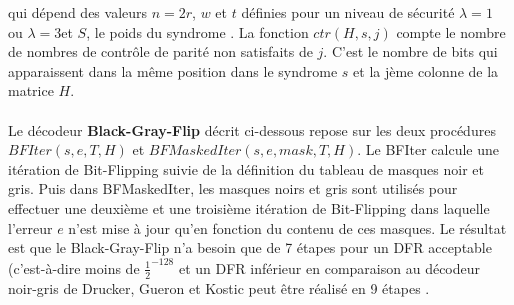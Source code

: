 \documentclass[12pt,openany]{report}
\begin{document}
qui dépend des valeurs $n = 2r$, $w$ et $t$ définies pour un niveau de sécurité $\lambda = 1$ ou
$\lambda = 3$et $S$, le poids du syndrome \cite{aragon2020}. La fonction $ctr(H, s, j)$ compte le nombre de nombres de contrôle de parité non satisfaits de $j$. C'est le nombre de bits qui apparaissent dans la même position dans le syndrome $s$ et la jème colonne de la matrice $\mathit{H}$.\\
\paragraph{}
Le décodeur \textbf{Black-Gray-Flip} décrit ci-dessous repose sur les deux procédures
$BFIter(s, e, T, H)$ et $BFMaskedIter(s, e, mask, T, H)$. Le BFIter calcule une
itération de Bit-Flipping suivie de la définition du tableau de masques noir et gris. Puis dans
BFMaskedIter, les masques noirs et gris sont utilisés pour effectuer une deuxième et une troisième
itération de Bit-Flipping dans laquelle l'erreur $e$ n'est mise à jour qu'en fonction du contenu
de ces masques. Le résultat est que le Black-Gray-Flip n'a besoin que de 7 étapes pour
un DFR acceptable (c'est-à-dire moins de $\frac{1}{2}^{-128}$ et un DFR inférieur en comparaison au décodeur noir-gris de Drucker, Gueron et Kostic \cite{drucker2019} peut être réalisé en 9 étapes \cite{drucker2019}.

\noindent\hrulefill\\
\end{document}
